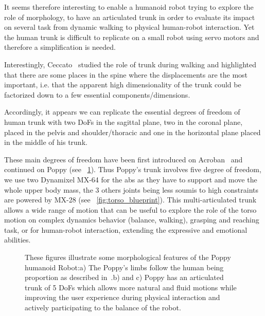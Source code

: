 It seems therefore interesting to enable a humanoid robot trying to explore the role of morphology, to have an articulated trunk in order to evaluate its impact on several task from dynamic walking to physical human-robot interaction. Yet the human trunk is difficult to replicate on a small robot using servo motors and therefore a simplification is needed.

Interestingly, Ceccato~\parencite{ceccatoPlos09} studied the role of trunk during walking and highlighted that there are some places in the spine where the displacements are the most important, i.e. that the apparent high dimensionality of the trunk could be factorized down to a few essential components/dimensions.

Accordingly, it appears we can replicate the essential degrees of freedom of human trunk with two DoFs in the sagittal plane, two in the coronal plane, placed in the pelvis and shoulder/thoracic and one in the horizontal plane placed in the middle of his trunk.

These main degrees of freedom have been first introduced on Acroban~\parencite{ly2011bio} and continued on Poppy (see \figurename~\ref{fig:poppy_torso}).
Thus Poppy's trunk involves five degree of freedom, we use two Dynamixel MX-64 for the abs as they have to support and move the whole upper body mass, the 3 others joints being less soumis to high constraints are powered by MX-28 (see \figurename~\ref{fig:torso_blueprint}). This multi-articulated trunk allows a wide range of motion that can be useful to explore the role of the torso motion on complex dynamics behavior (balance, walking), grasping and reaching task, or for human-robot interaction, extending the expressive and emotional abilities.

\begin{figure}[p]
\centering


    \hfil
    \caption{These figures illustrate some morphological features of the Poppy humanoid Robot:\newline a) The Poppy's limbs follow the human being proportion as described in~\parencite{dufour2005biomecanique}.\newline b) and c) Poppy has an articulated trunk of 5 DoFs which allows more natural and fluid motions while improving the user experience during physical interaction and actively participating to the balance of the robot.}
    \label{fig:poppy_torso}
\end{figure}



